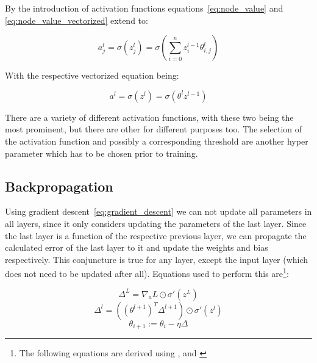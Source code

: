 By the introduction of activation functions equations~\eqref{eq:node_value} and \eqref{eq:node_value_vectorized} extend to:

\begin{equation} \label{eq:activation}
    a^l_j = \sigma(z^l_j) = \sigma(\sum^n_{i=0}z^{l-1}_i\theta^l_{i, j})
\end{equation}

With the respective vectorized equation being:

\begin{equation} \label{eq:activation_vectorized}
    a^l = \sigma(z^l) = \sigma(\theta^l z^{l-1})
\end{equation}

There are a variety of different activation functions, with these two being the most prominent, but there are other for different purposes too. The selection of the activation function and possibly a corresponding threshold are another hyper parameter which has to be chosen prior to training.

\subsection{Backpropagation}

Using gradient descent~\eqref{eq:gradient_descent} we can not update all parameters in all layers, since it only considers updating the parameters of the last layer.
Since the last layer is a function of the respective previous layer, we can propagate the calculated error of the last layer to it and update the weights and bias respectively. This conjuncture is true for any layer, except the input layer (which does not need to be updated after all).
Equations used to perform this are\footnote{The following equations are derived using \cite[p.733]{StuartRussell2018}, \cite[p.197]{Goodfellow2017} and \cite{Nielsen2015, ch.2}}:

\begin{equation}\label{eq:output_error}
    \varDelta^L = \nabla_a L \odot \sigma'(z^L)
\end{equation}
\begin{equation}\label{eq:hidden_error}
    \varDelta^l = ((\theta^{l+1})^T \varDelta^{l+1}) \odot \sigma'(z^l)
\end{equation}
\begin{equation} \label{eq:backprop_update}
    \theta_{i+1} := \theta_i - \eta \varDelta
\end{equation}

